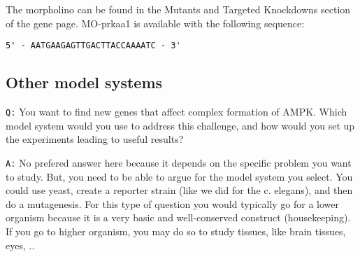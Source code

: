\documentclass[11pt, a4paper,titlepage]{article}
\begin{document}
The morpholino can be found in the Mutants and Targeted Knockdowns
section of the gene page. MO-prkaa1 is available with the following
sequence:

\begin{verbatim}
5' - AATGAAGAGTTGACTTACCAAAATC - 3'
\end{verbatim}

\subsection*{Other model systems}

\texttt{Q:} You want to find new genes that affect complex formation
of AMPK. Which model system would you use to address this challenge,
and how would you set up the experiments leading to useful results?
\smallskip

\noindent\texttt{A:} No prefered answer here because it depends on the
specific problem you want to study. But, you need to be able to argue
for the model system you select. You could use yeast, create a
reporter strain (like we did for the c. elegans), and then do a
mutagenesis. For this type of question you would typically go for a
lower organism because it is a very basic and well-conserved construct
(housekeeping). If you go to higher organism, you may do so to study
tissues, like brain tissues, eyes, ..

 
\end{document}
